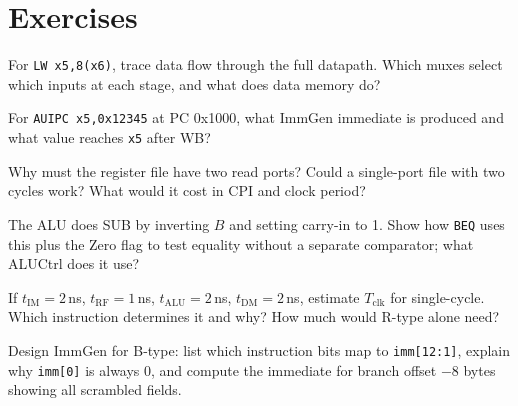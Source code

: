 \section{Exercises}
\begin{exercise}For \texttt{LW x5,8(x6)}, trace data flow through the full datapath. Which muxes select which inputs at each stage, and what does data memory do?\end{exercise}
\begin{exercise}For \texttt{AUIPC x5,0x12345} at PC 0x1000, what ImmGen immediate is produced and what value reaches \texttt{x5} after WB?\end{exercise}
\begin{exercise}Why must the register file have two read ports? Could a single-port file with two cycles work? What would it cost in CPI and clock period?\end{exercise}
\begin{exercise}The ALU does SUB by inverting $B$ and setting carry-in to 1. Show how \texttt{BEQ} uses this plus the Zero flag to test equality without a separate comparator; what ALUCtrl does it use?\end{exercise}
\begin{exercise}If $t_{\text{IM}}=2$\,ns, $t_{\text{RF}}=1$\,ns, $t_{\text{ALU}}=2$\,ns, $t_{\text{DM}}=2$\,ns, estimate $T_{\text{clk}}$ for single-cycle. Which instruction determines it and why? How much would R-type alone need?\end{exercise}
\begin{exercise}Design ImmGen for B-type: list which instruction bits map to \texttt{imm[12:1]}, explain why \texttt{imm[0]} is always 0, and compute the immediate for branch offset $-8$ bytes showing all scrambled fields.\end{exercise}
